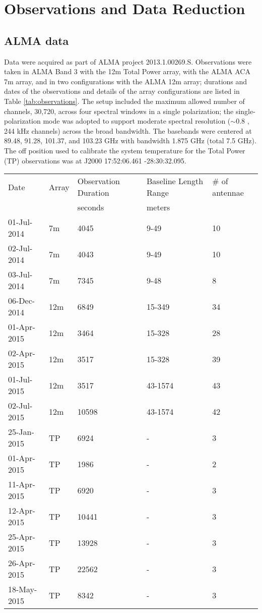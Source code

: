 \documentclass[twocolumn]{aastex61}
\begin{document}
\section{Observations and Data Reduction}
\label{sec:observations}
\subsection{ALMA data}
Data were acquired as part of ALMA project 2013.1.00269.S.  Observations were
taken in ALMA Band 3 with the 12m Total Power array, with the ALMA ACA 7m array, and
in two configurations with the ALMA 12m array; durations and dates of the
observations and details of the array configurations are listed in Table
\ref{tab:observations}.  The setup included the maximum allowed number of
channels, 30,720, across four spectral windows in a single polarization; the
single-polarization mode was adopted to support moderate spectral resolution
($\sim0.8$ \kms, 244 kHz channels) across the broad bandwidth.  The basebands
were centered at 89.48, 91.28, 101.37, and 103.23 GHz with bandwidth 1.875 GHz
(total 7.5 GHz).  The off position used to calibrate the system temperature for
the Total Power (TP) observations was at J2000 17:52:06.461
-28:30:32.095.


\begin{table*}[htp]
\centering
\caption{Observation Summary}
\begin{tabular}{lllll}
\label{tab:observations}
Date & Array & Observation Duration &  Baseline Length Range  & \# of antennae\\
     &       & seconds              & meters                    & \\
\hline
01-Jul-2014 & 7m & 4045 & 9-49 & 10\\
02-Jul-2014 & 7m & 4043 & 9-49 & 10\\
03-Jul-2014 & 7m & 7345 & 9-48 & 8\\
06-Dec-2014 & 12m & 6849 & 15-349 & 34\\
01-Apr-2015 & 12m & 3464 & 15-328 & 28\\
02-Apr-2015 & 12m & 3517 & 15-328 & 39\\
01-Jul-2015 & 12m & 3517 & 43-1574 & 43\\
02-Jul-2015 & 12m & 10598 & 43-1574 & 42\\

\hline

25-Jan-2015 & TP & 6924  & - & 3\\
01-Apr-2015 & TP & 1986  & - & 2\\
11-Apr-2015 & TP & 6920  & - & 3\\
12-Apr-2015 & TP & 10441 & - & 3\\
25-Apr-2015 & TP & 13928 & - & 3\\
26-Apr-2015 & TP & 22562 & - & 3\\
18-May-2015 & TP & 8342  & - & 3\\
\hline
\end{tabular}
\end{table*}
\end{document}
